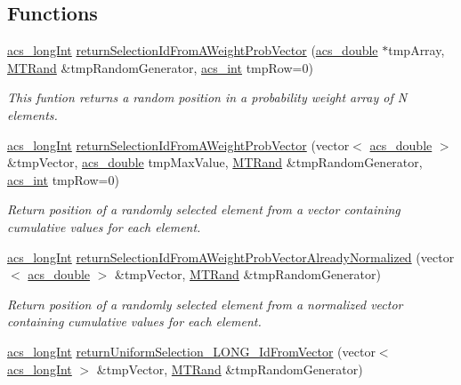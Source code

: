 \subsection*{Functions}
\begin{DoxyCompactItemize}
\item 
\hyperlink{a00066_a19319d75f02db4308bc5c0026d98cd85}{acs\-\_\-long\-Int} \hyperlink{a00070_ab1b8087986873e2bb998bac0e7918b50}{return\-Selection\-Id\-From\-A\-Weight\-Prob\-Vector} (\hyperlink{a00066_ab776853a005fcbf56af0424a2a4dd607}{acs\-\_\-double} $\ast$tmp\-Array, \hyperlink{a00008}{M\-T\-Rand} \&tmp\-Random\-Generator, \hyperlink{a00066_a8d277355641a098190360234e2ebde35}{acs\-\_\-int} tmp\-Row=0)
\begin{DoxyCompactList}\small\item\em This funtion returns a random position in a probability weight array of N elements. \end{DoxyCompactList}\item 
\hyperlink{a00066_a19319d75f02db4308bc5c0026d98cd85}{acs\-\_\-long\-Int} \hyperlink{a00070_ae4d6f026d5445b877a52e326fd95a081}{return\-Selection\-Id\-From\-A\-Weight\-Prob\-Vector} (vector$<$ \hyperlink{a00066_ab776853a005fcbf56af0424a2a4dd607}{acs\-\_\-double} $>$ \&tmp\-Vector, \hyperlink{a00066_ab776853a005fcbf56af0424a2a4dd607}{acs\-\_\-double} tmp\-Max\-Value, \hyperlink{a00008}{M\-T\-Rand} \&tmp\-Random\-Generator, \hyperlink{a00066_a8d277355641a098190360234e2ebde35}{acs\-\_\-int} tmp\-Row=0)
\begin{DoxyCompactList}\small\item\em Return position of a randomly selected element from a vector containing cumulative values for each element. \end{DoxyCompactList}\item 
\hyperlink{a00066_a19319d75f02db4308bc5c0026d98cd85}{acs\-\_\-long\-Int} \hyperlink{a00070_a4135ff15fd24eb8fbfee3d00e1cfbf20}{return\-Selection\-Id\-From\-A\-Weight\-Prob\-Vector\-Already\-Normalized} (vector$<$ \hyperlink{a00066_ab776853a005fcbf56af0424a2a4dd607}{acs\-\_\-double} $>$ \&tmp\-Vector, \hyperlink{a00008}{M\-T\-Rand} \&tmp\-Random\-Generator)
\begin{DoxyCompactList}\small\item\em Return position of a randomly selected element from a normalized vector containing cumulative values for each element. \end{DoxyCompactList}\item 
\hyperlink{a00066_a19319d75f02db4308bc5c0026d98cd85}{acs\-\_\-long\-Int} \hyperlink{a00070_a1cb9cc6ac8ec2ef62b8eb1970e73a11b}{return\-Uniform\-Selection\-\_\-\-L\-O\-N\-G\-\_\-\-Id\-From\-Vector} (vector$<$ \hyperlink{a00066_a19319d75f02db4308bc5c0026d98cd85}{acs\-\_\-long\-Int} $>$ \&tmp\-Vector, \hyperlink{a00008}{M\-T\-Rand} \&tmp\-Random\-Generator)

\end{DoxyCompactItemize}
